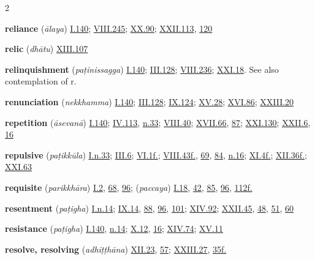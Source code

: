 \begin{multicols}{2}
\begin{vismHanging}
\par\textbf{reliance} (\emph{ālaya}) \hyperlink{I.140}{I.140}{}; \hyperlink{VIII.245}{VIII.245}{}; \hyperlink{XX.90}{XX.90}{}; \hyperlink{XXII.113}{XXII.113}{}, \hyperlink{XXII.120}{120}{}
\par\textbf{relic} (\emph{dhātu}) \hyperlink{XIII.107}{XIII.107}{}
\par\textbf{relinquishment} (\emph{paṭinissagga}) \hyperlink{I.140}{I.140}{}; \hyperlink{III.128}{III.128}{}; \hyperlink{VIII.236}{VIII.236}{}; \hyperlink{XXI.18}{XXI.18}{}. See also contemplation of r. 
\par\textbf{renunciation} (\emph{nekkhamma}) \hyperlink{I.140}{I.140}{}; \hyperlink{III.128}{III.128}{}; \hyperlink{IX.124}{IX.124}{}; \hyperlink{XV.28}{XV.28}{}; \hyperlink{XVI.86}{XVI.86}{}; \hyperlink{XXIII.20}{XXIII.20}{}
\par\textbf{repetition} (\emph{āsevanā}) \hyperlink{I.140}{I.140}{}; \hyperlink{IV.113}{IV.113}{}, \hyperlink{IV.n33}{n.33}{}; \hyperlink{VIII.40}{VIII.40}{}; \hyperlink{XVII.66}{XVII.66}{}, \hyperlink{XVII.87}{87}{}; \hyperlink{XXI.130}{XXI.130}{}; \hyperlink{XXII.6}{XXII.6}{}, \hyperlink{XXII.16}{16}{}
\par\textbf{repulsive} (\emph{paṭikkūla}) \hyperlink{I.n33}{I.n.33}{}; \hyperlink{III.6}{III.6}{}; \hyperlink{VI.1}{VI.1f.}{}; \hyperlink{VIII.43}{VIII.43f.}{}, \hyperlink{VIII.69}{69}{}, \hyperlink{VIII.84}{84}{}, \hyperlink{VIII.n16}{n.16}{}; \hyperlink{XI.4}{XI.4f.}{}; \hyperlink{XII.36}{XII.36f.}{}; \hyperlink{XXI.63}{XXI.63}{}
\par\textbf{requisite} (\emph{parikkhāra}) \hyperlink{I.2}{I.2}{}, \hyperlink{I.68}{68}{}, \hyperlink{I.96}{96}{}; (\emph{paccaya}) \hyperlink{I.18}{I.18}{}, \hyperlink{I.42}{42}{}, \hyperlink{I.85}{85}{}, \hyperlink{I.96}{96}{}, \hyperlink{I.112}{112f.}{}
\par\textbf{resentment} (\emph{paṭigha}) \hyperlink{I.n14}{I.n.14}{}; \hyperlink{IX.14}{IX.14}{}, \hyperlink{IX.88}{88}{}, \hyperlink{IX.96}{96}{}, \hyperlink{IX.101}{101}{}; \hyperlink{XIV.92}{XIV.92}{}; \hyperlink{XXII.45}{XXII.45}{}, \hyperlink{XXII.48}{48}{}, \hyperlink{XXII.51}{51}{}, \hyperlink{XXII.60}{60}{}
\par\textbf{resistance} (\emph{paṭigha}) \hyperlink{I.140}{I.140}{}, \hyperlink{I.n14}{n.14}{}; \hyperlink{X.12}{X.12}{}, \hyperlink{X.16}{16}{}; \hyperlink{XIV.74}{XIV.74}{}; \hyperlink{XV.11}{XV.11}{}
\par\textbf{resolve, resolving} (\emph{adhiṭṭhāna}) \hyperlink{XII.23}{XII.23}{}, \hyperlink{XII.57}{57}{}; \hyperlink{XXIII.27}{XXIII.27}{}, \hyperlink{XXIII.35}{35f.}{}

\end{vismHanging}
\end{multicols}
